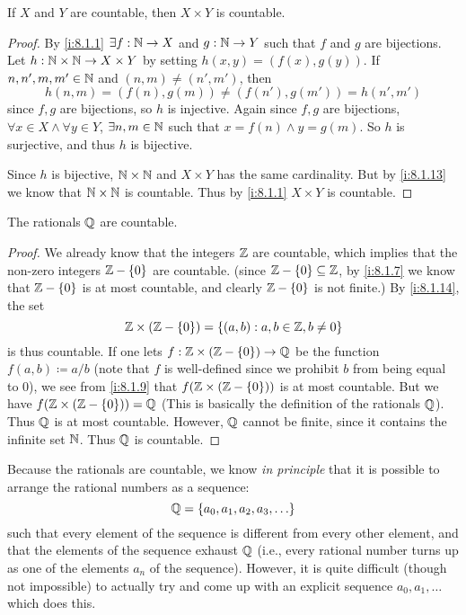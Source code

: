 \begin{cor}\label{i:8.1.14}
  If \(X\) and \(Y\) are countable, then \(X \times Y\) is countable.
\end{cor}

\begin{proof}
  By \cref{i:8.1.1} \(\exists f : \mathbb{N} \to X\) and \(g : \mathbb{N} \to Y\) such that \(f\) and \(g\) are bijections.
  Let \(h : \mathbb{N} \times \mathbb{N} \to X \times Y\) by setting \(h(x, y) = (f(x), g(y))\).
  If \(n, n', m, m' \in \mathbb{N}\) and \((n, m) \neq (n', m')\), then
  \[
    h(n, m) = (f(n), g(m)) \neq (f(n'), g(m')) = h(n', m')
  \]
  since \(f, g\) are bijections, so \(h\) is injective.
  Again since \(f, g\) are bijections, \(\forall x \in X \land \forall y \in Y\), \(\exists n, m \in \mathbb{N}\) such that \(x = f(n) \land y = g(m)\).
  So \(h\) is surjective, and thus \(h\) is bijective.

  Since \(h\) is bijective, \(\mathbb{N} \times \mathbb{N}\) and \(X \times Y\) has the same cardinality.
  But by \cref{i:8.1.13} we know that \(\mathbb{N} \times \mathbb{N}\) is countable.
  Thus by \cref{i:8.1.1} \(X \times Y\) is countable.
\end{proof}

\begin{cor}\label{i:8.1.15}
  The rationals \(\mathbb{Q}\) are countable.
\end{cor}

\begin{proof}
  We already know that the integers \(\mathbb{Z}\) are countable, which implies that the non-zero integers \(\mathbb{Z} - \left\lbrace0\right\rbrace\) are countable.
  (since \(\mathbb{Z} - \left\lbrace0\right\rbrace \subseteq \mathbb{Z}\), by \cref{i:8.1.7} we know that \(\mathbb{Z} - \left\lbrace0\right\rbrace\) is at most countable, and clearly \(\mathbb{Z} - \left\lbrace0\right\rbrace\) is not finite.)
  By \cref{i:8.1.14}, the set
  \[
    \mathbb{Z} \times (\mathbb{Z} - \left\lbrace0\right\rbrace) = \left\lbrace(a, b) : a, b \in \mathbb{Z}, b \neq 0\right\rbrace
  \]
  is thus countable.
  If one lets \(f : \mathbb{Z} \times (\mathbb{Z} - \left\lbrace0\right\rbrace) \to \mathbb{Q}\) be the function \(f(a, b) \coloneqq a / b\)
  (note that \(f\) is well-defined since we prohibit \(b\) from being equal to \(0\)), we see from \cref{i:8.1.9} that \(f(\mathbb{Z} \times (\mathbb{Z} - \left\lbrace0\right\rbrace))\) is at most countable.
  But we have \(f(\mathbb{Z} \times (\mathbb{Z} - \left\lbrace0\right\rbrace)) = \mathbb{Q}\)
  (This is basically the definition of the rationals \(\mathbb{Q}\)).
  Thus \(\mathbb{Q}\) is at most countable.
  However, \(\mathbb{Q}\) cannot be finite, since it contains the infinite set \(\mathbb{N}\).
  Thus \(\mathbb{Q}\) is countable.
\end{proof}

\begin{rmk}\label{i:8.1.16}
  Because the rationals are countable, we know \emph{in principle} that it is possible to arrange the rational numbers as a sequence:
  \[
    \Q = \set{a_0, a_1, a_2, a_3, \dots}
  \]
  such that every element of the sequence is different from every other element, and that the elements of the sequence exhaust \(\mathbb{Q}\)
  (i.e., every rational number turns up as one of the elements \(a_n\) of the sequence).
  However, it is quite difficult (though not impossible) to actually try and come up with an explicit sequence \(a_0, a_1, \dots\) which does this.
\end{rmk}

